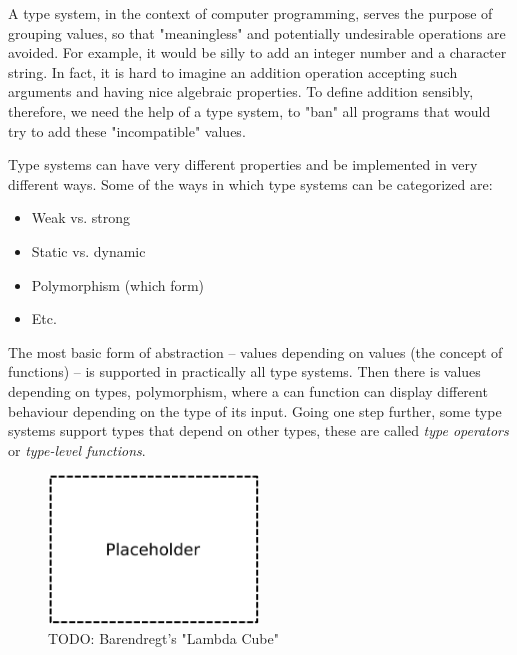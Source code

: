             A type system, in the context of computer programming,
            serves the purpose of grouping values, so that "meaningless" and potentially undesirable operations are avoided.
            For example, it would be silly to add an integer number and a character string.
            In fact, it is hard to imagine an addition operation accepting such arguments and having nice algebraic properties.
            To define addition sensibly, therefore, we need the help of a type system, to "ban" all programs that would
            try to add these "incompatible" values.

            Type systems can have very different properties and be implemented in very different ways.
            Some of the ways in which type systems can be categorized are:
            \begin{itemize}
                \item Weak vs. strong
                \item Static vs. dynamic
                \item Polymorphism (which form)
                \item Etc.
            \end{itemize}

            The most basic form of abstraction -- values depending on values (the concept of functions) -- is
            supported in practically all type systems.
            Then there is values depending on types, polymorphism, where a can function can display different
            behaviour depending on the type of its input.
            Going one step further, some type systems support types that depend on other types, these are
            called \emph{type operators} or \emph{type-level functions}.

            \begin{figure}[h]
                \centerline{\includegraphics[width=0.5\textwidth]{imgs/lambda-cube.pdf}}
                \caption{TODO: Barendregt's "Lambda Cube" \label{fig:lambda-cube}}
            \end{figure}


